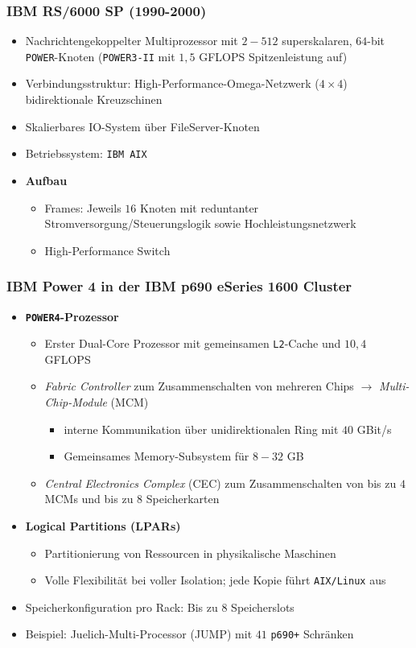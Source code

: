 \subsubsection{IBM RS/6000 SP (1990-2000)}
\begin{itemize}
	\item Nachrichtengekoppelter Multiprozessor mit \(2-512\) superskalaren, \(64\)-bit \texttt{POWER}-Knoten (\texttt{POWER3-II} mit \(1,5 \) GFLOPS Spitzenleistung auf)
	\item Verbindungsstruktur: High-Performance-Omega-Netzwerk (\(4 \times 4\)) bidirektionale Kreuzschinen
	\item Skalierbares IO-System über FileServer-Knoten
	\item Betriebssystem: \texttt{IBM AIX}
	\item \textbf{Aufbau}
	\begin{itemize}
		\item Frames: Jeweils \(16\) Knoten mit reduntanter Stromversorgung/Steuerungslogik sowie Hochleistungsnetzwerk
		\item High-Performance Switch
	\end{itemize}
\end{itemize}

\subsubsection{IBM Power 4 in der IBM p690 eSeries 1600 Cluster}
\begin{itemize}
	\item \textbf{\texttt{POWER4}-Prozessor}
	\begin{itemize}
		\item Erster Dual-Core Prozessor mit gemeinsamen \texttt{L2}-Cache und \(10,4\) GFLOPS
		\item \textit{Fabric Controller} zum Zusammenschalten von mehreren Chips \(\rightarrow\) \textit{Multi-Chip-Module} (MCM)
		\begin{itemize}
			\item interne Kommunikation über unidirektionalen Ring mit \(40\) GBit/s
			\item Gemeinsames Memory-Subsystem für \(8-32\) GB
		\end{itemize}
		\item \textit{Central Electronics Complex} (CEC) zum Zusammenschalten von bis zu \(4\) MCMs und bis zu \(8\) Speicherkarten
	\end{itemize}
	\item \textbf{Logical Partitions (LPARs)}
	\begin{itemize}
		\item Partitionierung von Ressourcen in physikalische Maschinen
		\item Volle Flexibilität bei voller Isolation; jede Kopie führt \texttt{AIX/Linux} aus
	\end{itemize}
	\item Speicherkonfiguration pro Rack: Bis zu \(8\) Speicherslots
	\item Beispiel: Juelich-Multi-Processor (JUMP) mit \(41\) \texttt{p690+} Schränken
\end{itemize}


